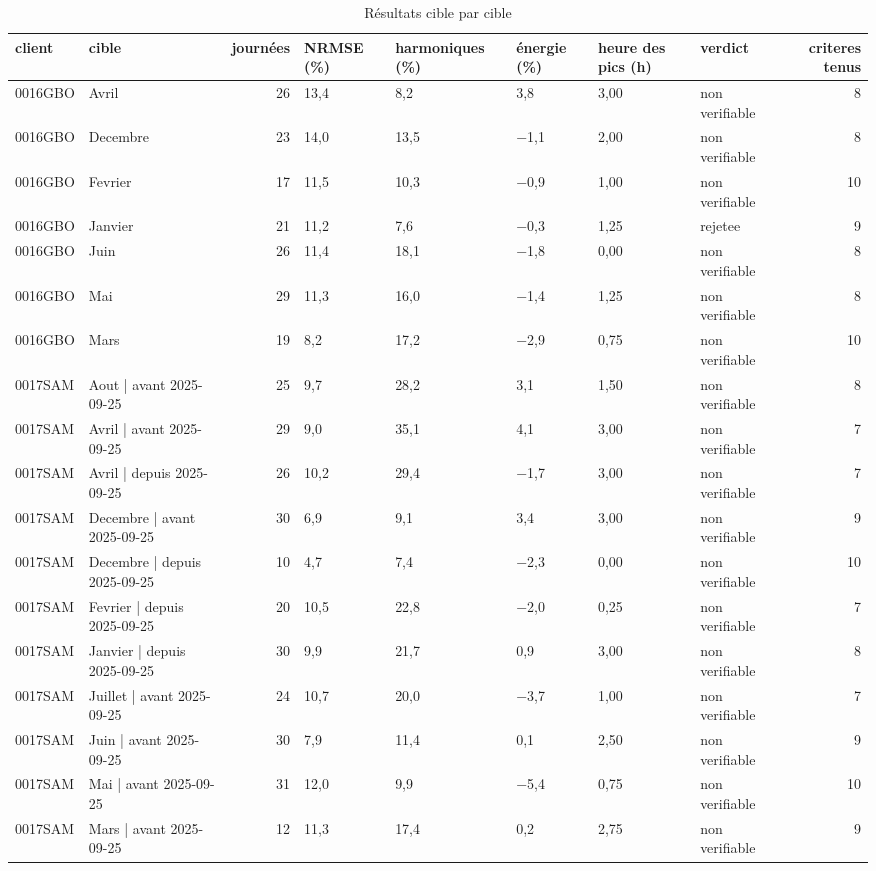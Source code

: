 \begin{table}[htbp]
\caption{Résultats cible par cible}
\label{tab:resultats_par_cible}
\begin{tabular}{llrlllllr}
\toprule
client & cible & journées & NRMSE (\%) & harmoniques (\%) & énergie (\%) & heure des pics (h) & verdict & criteres tenus \\
\midrule
0016GBO & Avril & 26 & 13,4 & 8,2 & 3,8 & 3,00 & non verifiable & 8 \\
0016GBO & Decembre & 23 & 14,0 & 13,5 & −1,1 & 2,00 & non verifiable & 8 \\
0016GBO & Fevrier & 17 & 11,5 & 10,3 & −0,9 & 1,00 & non verifiable & 10 \\
0016GBO & Janvier & 21 & 11,2 & 7,6 & −0,3 & 1,25 & rejetee & 9 \\
0016GBO & Juin & 26 & 11,4 & 18,1 & −1,8 & 0,00 & non verifiable & 8 \\
0016GBO & Mai & 29 & 11,3 & 16,0 & −1,4 & 1,25 & non verifiable & 8 \\
0016GBO & Mars & 19 & 8,2 & 17,2 & −2,9 & 0,75 & non verifiable & 10 \\
0017SAM & Aout | avant 2025-09-25 & 25 & 9,7 & 28,2 & 3,1 & 1,50 & non verifiable & 8 \\
0017SAM & Avril | avant 2025-09-25 & 29 & 9,0 & 35,1 & 4,1 & 3,00 & non verifiable & 7 \\
0017SAM & Avril | depuis 2025-09-25 & 26 & 10,2 & 29,4 & −1,7 & 3,00 & non verifiable & 7 \\
0017SAM & Decembre | avant 2025-09-25 & 30 & 6,9 & 9,1 & 3,4 & 3,00 & non verifiable & 9 \\
0017SAM & Decembre | depuis 2025-09-25 & 10 & 4,7 & 7,4 & −2,3 & 0,00 & non verifiable & 10 \\
0017SAM & Fevrier | depuis 2025-09-25 & 20 & 10,5 & 22,8 & −2,0 & 0,25 & non verifiable & 7 \\
0017SAM & Janvier | depuis 2025-09-25 & 30 & 9,9 & 21,7 & 0,9 & 3,00 & non verifiable & 8 \\
0017SAM & Juillet | avant 2025-09-25 & 24 & 10,7 & 20,0 & −3,7 & 1,00 & non verifiable & 7 \\
0017SAM & Juin | avant 2025-09-25 & 30 & 7,9 & 11,4 & 0,1 & 2,50 & non verifiable & 9 \\
0017SAM & Mai | avant 2025-09-25 & 31 & 12,0 & 9,9 & −5,4 & 0,75 & non verifiable & 10 \\
0017SAM & Mars | avant 2025-09-25 & 12 & 11,3 & 17,4 & 0,2 & 2,75 & non verifiable & 9 \\

\end{tabular}
\end{table}
